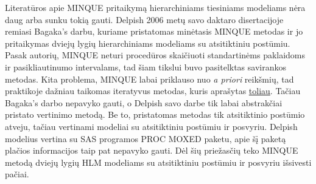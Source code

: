 \documentclass[12pt,a4paper]{article}
\begin{document}
 Literatūros apie MINQUE pritaikymą hierarchiniams tiesiniams modeliams nėra daug arba sunku tokią gauti. Delpish\cite{delpish} 2006 metų savo daktaro disertacijoje remiasi Bagaka's\cite{bagaka} darbu, kuriame pristatomas minėtasis MINQUE metodas ir jo pritaikymas dviejų lygių hierarchiniams modeliams su atsitiktiniu postūmiu. Pasak autorių, MINQUE neturi procedūros skaičiuoti standartinėms paklaidoms ir pasikliautinumo intervalams, tad šiam tikslui buvo pasitelktas savirankos metodas. Kita problema, MINQUE labai priklauso nuo \textit{a priori} reikšmių, tad praktikoje dažniau taikomas iteratyvus metodas, kuris aprašytas \hyperlink{iminque}{toliau}. Tačiau Bagaka's darbo nepavyko gauti, o Delpish savo darbe tik labai abstrakčiai pristato vertinimo metodą. Be to, pristatomas metodas tik atsitiktinio postūmio atveju, tačiau vertinami modeliai su atsitiktiniu postūmiu ir posvyriu. Delpish modelius vertina su SAS programos PROC MOXED paketu, apie šį paketą plačios informacijos taip pat nepavyko gauti. Dėl šių priežasčių teko MINQUE metodą dviejų lygių HLM modeliams su atsitiktiniu postūmiu ir posvyriu išsivesti pačiai.
\end{document}
